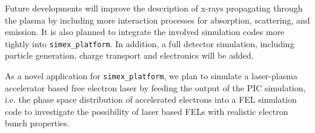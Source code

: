 \documentclass[10pt]{scrartcl}
\begin{document}
Future developments will improve the description of x-rays propagating through
the plasma by including more interaction processes for absorption, scattering,
and emission. It is also planned to integrate the involved simulation codes more
tightly into \texttt{simex\_platform}. In addition, a full detector simulation,
including particle generation, charge transport and electronics will be added.

As a novel application for \texttt{simex\_platform}, we plan to simulate a
laser-plasma accelerator based free electron laser by feeding the output of the
PIC simulation, i.e. the phase space distribution of accelerated electrons into
a FEL simulation code to investigate the possibility of laser based FELs with
realistic electron bunch properties.

\printbibliography[]
\end{document}
